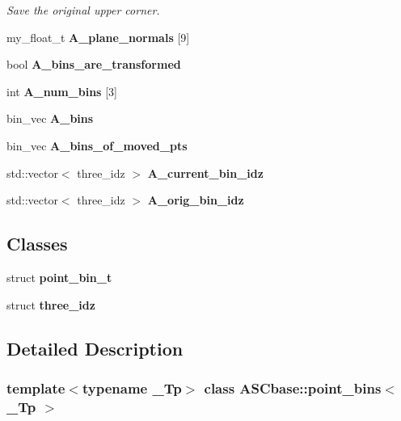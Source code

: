 \begin{CompactItemize}
\begin{CompactList}\small\item\em Save the original upper corner. \item\end{CompactList}\item 
my\_\-float\_\-t \textbf{A\_\-plane\_\-normals} [9]\label{classASCbase_1_1point__bins_cebae3f68f32e3ad48fb3671718af31c}

\item 
bool \textbf{A\_\-bins\_\-are\_\-transformed}\label{classASCbase_1_1point__bins_86ca99c80831c972f89b0b20a185c519}

\item 
int \textbf{A\_\-num\_\-bins} [3]\label{classASCbase_1_1point__bins_0e3467b19cfeec3ac7590c10359489b9}

\item 
bin\_\-vec \textbf{A\_\-bins}\label{classASCbase_1_1point__bins_2297473c684667dd9f33619dabb50095}

\item 
bin\_\-vec \textbf{A\_\-bins\_\-of\_\-moved\_\-pts}\label{classASCbase_1_1point__bins_4fc0db7bdcd0d6ca24626a770899ec73}

\item 
std::vector$<$ three\_\-idz $>$ \textbf{A\_\-current\_\-bin\_\-idz}\label{classASCbase_1_1point__bins_2026dd01beaac118d479d1649ca4c1f4}

\item 
std::vector$<$ three\_\-idz $>$ \textbf{A\_\-orig\_\-bin\_\-idz}\label{classASCbase_1_1point__bins_01f7a076413e0ade2db4a8b808e18416}

\end{CompactItemize}
\subsection*{Classes}
\begin{CompactItemize}
\item 
struct \textbf{point\_\-bin\_\-t}
\item 
struct \textbf{three\_\-idz}
\end{CompactItemize}


\subsection{Detailed Description}
\subsubsection*{template$<$typename \_\-Tp$>$ class ASCbase::point\_\-bins$<$ \_\-Tp $>$}

